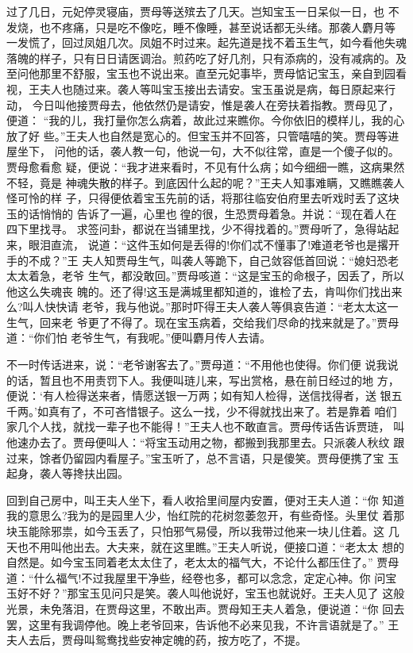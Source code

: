过了几日，元妃停灵寝庙，贾母等送殡去了几天。岂知宝玉一日呆似一日，也
不发烧，也不疼痛，只是吃不像吃，睡不像睡，甚至说话都无头绪。那袭人麝月等
一发慌了，回过凤姐几次。凤姐不时过来。起先道是找不着玉生气，如今看他失魂
落魄的样子，只有日日请医调治。煎药吃了好几剂，只有添病的，没有减病的。及
至问他那里不舒服，宝玉也不说出来。直至元妃事毕，贾母惦记宝玉，亲自到园看
视，王夫人也随过来。袭人等叫宝玉接出去请安。宝玉虽说是病，每日原起来行动，
今日叫他接贾母去，他依然仍是请安，惟是袭人在旁扶着指教。贾母见了，便道：
“我的儿，我打量你怎么病着，故此过来瞧你。今你依旧的模样儿，我的心放了好
些。”王夫人也自然是宽心的。但宝玉并不回答，只管嘻嘻的笑。贾母等进屋坐下，
问他的话，袭人教一句，他说一句，大不似往常，直是一个傻子似的。贾母愈看愈
疑，便说：“我才进来看时，不见有什么病；如今细细一瞧，这病果然不轻，竟是
神魂失散的样子。到底因什么起的呢？”王夫人知事难瞒，又瞧瞧袭人怪可怜的样
子，只得便依着宝玉先前的话，将那往临安伯府里去听戏时丢了这块玉的话悄悄的
告诉了一遍，心里也徨的很，生恐贾母着急。并说：“现在着人在四下里找寻。
求签问卦，都说在当铺里找，少不得找着的。”贾母听了，急得站起来，眼泪直流，
说道：“这件玉如何是丢得的!你们忒不懂事了!难道老爷也是撂开手的不成？”王
夫人知贾母生气，叫袭人等跪下，自己敛容低首回说：“媳妇恐老太太着急，老爷
生气，都没敢回。”贾母咳道：“这是宝玉的命根子，因丢了，所以他这么失魂丧
魄的。还了得!这玉是满城里都知道的，谁检了去，肯叫你们找出来么?叫人快快请
老爷，我与他说。”那时吓得王夫人袭人等俱哀告道：“老太太这一生气，回来老
爷更了不得了。现在宝玉病着，交给我们尽命的找来就是了。”贾母道：“你们怕
老爷生气，有我呢。”便叫麝月传人去请。

不一时传话进来，说：“老爷谢客去了。”贾母道：“不用他也使得。你们便
说我说的话，暂且也不用责罚下人。我便叫琏儿来，写出赏格，悬在前日经过的地
方，便说：‘有人检得送来者，情愿送银一万两；如有知人检得，送信找得者，送
银五千两。’如真有了，不可吝惜银子。这么一找，少不得就找出来了。若是靠着
咱们家几个人找，就找一辈子也不能得！”王夫人也不敢直言。贾母传话告诉贾琏，
叫他速办去了。贾母便叫人：“将宝玉动用之物，都搬到我那里去。只派袭人秋纹
跟过来，馀者仍留园内看屋子。”宝玉听了，总不言语，只是傻笑。贾母便携了宝
玉起身，袭人等搀扶出园。

回到自己房中，叫王夫人坐下，看人收拾里间屋内安置，便对王夫人道：“你
知道我的意思么?我为的是园里人少，怡红院的花树忽萎忽开，有些奇怪。头里仗
着那块玉能除邪祟，如今玉丢了，只怕邪气易侵，所以我带过他来一块儿住着。这
几天也不用叫他出去。大夫来，就在这里瞧。”王夫人听说，便接口道：“老太太
想的自然是。如今宝玉同着老太太住了，老太太的福气大，不论什么都压住了。”
贾母道：“什么福气!不过我屋里干净些，经卷也多，都可以念念，定定心神。你
问宝玉好不好？”那宝玉见问只是笑。袭人叫他说好，宝玉也就说好。王夫人见了
这般光景，未免落泪，在贾母这里，不敢出声。贾母知王夫人着急，便说道：“你
回去罢，这里有我调停他。晚上老爷回来，告诉他不必来见我，不许言语就是了。”
王夫人去后，贾母叫鸳鸯找些安神定魄的药，按方吃了，不提。

